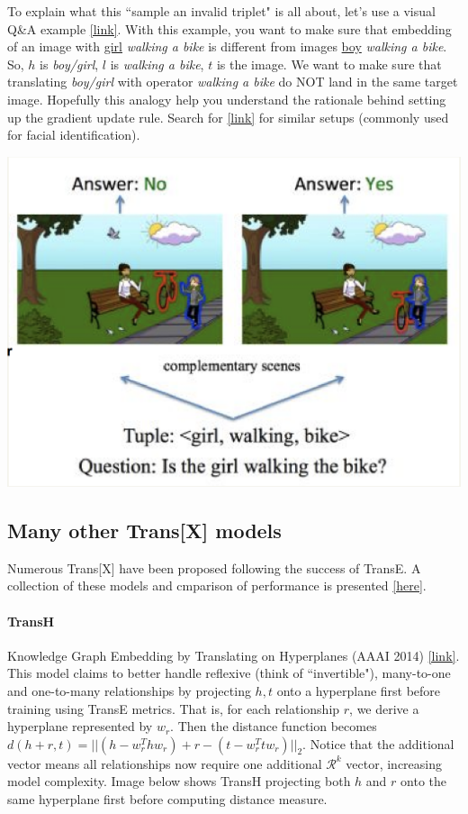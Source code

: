 To explain what this ``sample an invalid triplet" is all about, let's use a visual Q\&A example \href{https://people.cs.vt.edu/sudo777/files/siamese-network-pptx.pdf}{[link]}. With this example, you want to make sure that embedding of an image with \underline{girl} \textit{walking a bike} is different from images \underline{boy} \textit{walking a bike}. So, $h$ is \textit{boy/girl}, $l$ is \textit{walking a bike}, $t$ is the image. We want to make sure that translating \textit{boy/girl} with operator \textit{walking a bike} do NOT land in the same target image. Hopefully this analogy help you understand the rationale behind setting up the gradient update rule. Search for  \href{https://en.wikipedia.org/wiki/Siamese_neural_network}{[link]} for similar setups (commonly used for facial identification).

{
\centering
\includegraphics[width=0.6\linewidth]{notes/img/n5_siamese.png} \par
}

\subsection{Many other Trans[X] models} \label{ss_53_transr}

Numerous Trans[X] have been proposed following the success of TransE. A collection of these models and cmparison of performance is presented \href{https://github.com/thunlp/KB2E}{[here]}.

\paragraph{TransH} Knowledge Graph Embedding by Translating on Hyperplanes (AAAI 2014) \href{https://www.aaai.org/ocs/index.php/AAAI/AAAI14/paper/viewFile/8531/8546}{[link]}. This model claims to better handle reflexive (think of ``invertible"), many-to-one and one-to-many relationships by projecting $h, t$ onto a hyperplane first before training using TransE metrics. That is, for each relationship $r$, we derive a hyperplane represented by $w_r$. Then the distance function becomes $d(h+r, t) = ||(h - w_r^Thw_r) + r - (t - w_r^Ttw_r)||_2$. Notice that the additional vector means all relationships now require one additional $\mathcal{R}^k$ vector, increasing model complexity. Image below shows TransH projecting both $h$ and $r$ onto the same hyperplane first before computing distance measure. 

